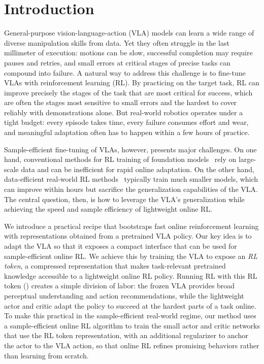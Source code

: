 \section{Introduction}
\label{sec:introduction}

General-purpose vision-language-action (VLA) models can learn a wide range of diverse manipulation skills from data. Yet they often struggle in the last millimeter of execution: motions can be slow, successful completion may require pauses and retries, and small errors at critical stages of precise tasks can compound into failure. A natural way to address this challenge is to fine-tune VLAs with reinforcement learning (RL). By practicing on the target task, RL can improve precisely the stages of the task that are most critical for success, which are often the stages most sensitive to small errors and the hardest to cover reliably with demonstrations alone. But real-world robotics operates under a tight budget: every episode takes time, every failure consumes effort and wear, and meaningful adaptation often has to happen within a few hours of practice.

Sample-efficient fine-tuning of VLAs, however, presents major challenges. On one hand, conventional methods for RL training of foundation models~\citep{Li2025SimpleVLA_RL,li2025grrlgoingdexterousprecise,pi06vla} rely on large-scale data and can be inefficient for rapid online adaptation. On the other hand, data-efficient real-world RL methods~\citep{luo2024precise,rl100} typically train much smaller models, which can improve within hours but sacrifice the generalization capabilities of the VLA. The central question, then, is how to leverage the VLA’s generalization while achieving the speed and sample efficiency of lightweight online RL.

We introduce a practical recipe that bootstraps fast online reinforcement learning with representations obtained from a pretrained VLA policy. Our key idea is to adapt the VLA so that it exposes a compact interface that can be used for sample-efficient online RL. We achieve this by training the VLA to expose an \emph{RL token}, a compressed representation that makes task-relevant pretrained knowledge accessible to a lightweight online RL policy. Running RL with this RL token (\MethodName{}) creates a simple division of labor: the frozen VLA provides broad perceptual understanding and action recommendations, while the lightweight actor and critic adapt the policy to succeed at the hardest parts of a task online. To make this practical in the sample-efficient real-world regime, our method uses a sample-efficient online RL algorithm to train the small actor and critic networks that use the RL token representation, with an additional regularizer to anchor the actor to the VLA action, so that online RL refines promising behaviors rather than learning from scratch.

